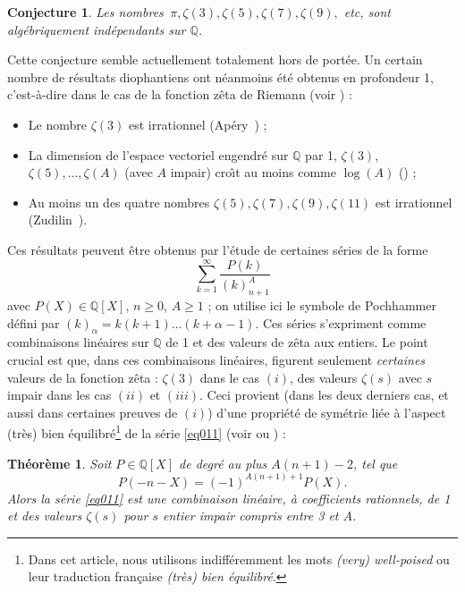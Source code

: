 \documentclass[12pt,francais, reqno]{smfart}
\numberwithin{equation}{section}
\def\al{\alpha}
\newcommand{\Q}{\mathbb Q}
\newtheorem{Th}{Th\'eor\`eme}
\newtheorem{Conj}{Conjecture}
\begin{document}
\begin{Conj}\label{conj:zeta alg inde} 
Les nombres $\,\pi, \zeta(3), \zeta(5), \zeta(7), \zeta(9),$ etc,
sont alg{\'e}brique\-ment ind{\'e}pen\-dants sur $\Q$.
\end{Conj}

Cette conjecture semble actuellement totalement hors de 
port\'ee. Un certain nombre de r\'esultats diophantiens ont 
n\'eanmoins 
\'et\'e  obtenus en profondeur 1, c'est-\`a-dire dans le cas 
de la 
fonction z\^eta de Riemann (voir \cite{SFBou}) : 
\begin{itemize}
\item[$(i)$] Le nombre $\zeta(3)$ est irrationnel (Ap\'ery~\cite{Apery}) ; 
\item[$(ii)$] La dimension de l'espace vectoriel engendr\'e sur $\Q$ par 1, 
$\zeta(3)$, $\zeta(5), \ldots, \zeta(A)$ (avec $A$ impair) cro{\^\i}t au moins comme $\log(A)$ 
(\cite{BR, RivoalCRAS}) ; 
\item[$(iii)$] Au moins un des quatre nombres $\zeta(5), \zeta(7), \zeta(9), \zeta(11)$ est irrationnel 
(Zudilin~\cite{Zudilinonze}).
\end{itemize}
Ces r\'esultats peuvent \^etre obtenus par l'\'etude de  
certaines s\'eries de la forme 
\begin{equation}\label{eq011}
\sum_{k=1}^{\infty} \frac{P(k)}{(k)_{n+1}^A}
\end{equation}
avec $P(X)\in\Q[X]$, $n\ge0$, $A\ge 1$ ; on utilise ici le symbole de Pochhammer 
d\'efini par $(k)_{\al} = k(k+1)\ldots (k+\al-1)$. Ces s\'eries s'expriment 
 comme combinaisons  lin\'eaires sur $\Q$  de 1 et des valeurs de z\^eta aux 
entiers. Le point crucial est que, dans ces combinaisons lin\'eaires, figurent 
seulement {\em certaines} valeurs de la fonction z\^eta : $\zeta(3)$ dans le cas $(i)$, des 
valeurs $\zeta(s)$ avec $s$ impair dans les cas $(ii)$ et $(iii)$. Ceci provient 
(dans les deux derniers cas, et aussi dans certaines preuves de $(i)$) d'une 
propri\'et\'e de sym\'etrie li\'ee \`a l'aspect (tr\`es) bien \'equilibr\'e\footnote{Dans cet article, nous utilisons
indiff\'eremment les mots {\em (very) well-poised} ou leur traduction fran\c caise {\em (tr\`es) bien \'equilibr\'e}.}
 de 
la s\'erie \eqref{eq011} (voir \cite{BR} ou \cite{RivoalCRAS}) : 

\begin{Th} \label{thwp}
Soit $P \in \Q[X]$ de degr\'e au plus $A(n+1)-2$, tel que 
$$P(-n-X) = (-1)^{A(n+1)+1} P(X).$$
Alors la s\'erie \eqref{eq011} est une combinaison  lin\'eaire, \`a coefficients 
rationnels, de 1 et des valeurs $\zeta(s)$ pour $s$ entier impair compris entre 3 et $A$.
\end{Th}
\end{document}
